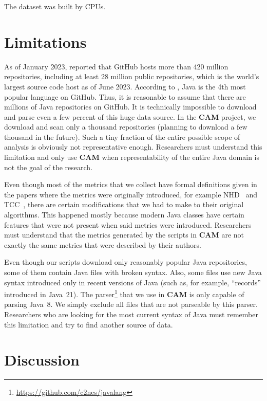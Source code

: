 \documentclass[sigplan,nonacm,review,anonymous]{acmart}
\newcommand\cam{{\sffamily\bfseries CAM}}
\begin{document}
The dataset was built by
\unskip{}
CPUs\unskip{}.

\section{Limitations}\label{sec:limitations}

As of January 2023, \citet{dohmke2023} reported that GitHub hosts more than
420 million repositories, including at least 28 million public repositories,
which is the world's largest source code host as of June 2023. According
to \citep{daigle2023}, Java is the 4th most popular language on GitHub. Thus,
it is reasonable to assume that there are millions of Java repositories on
GitHub. It is technically impossible to download and parse even a few percent
of this huge data source. In the \cam{} project, we download and scan only a
thousand repositories (planning to download a few thousand in the future).
Such a tiny fraction of the entire possible scope of analysis is obviously
not representative enough. Researchers must understand this limitation and
only use \cam{} when representability of the entire Java domain is not the
goal of the research.

Even though most of the metrics that we collect have formal definitions
given in the papers where the metrics were originally introduced,
for example NHD~\citep{counsell2006interpretation} and
TCC~\citep{bieman1995cohesion}, there are certain modifications
that we had to make to their original algorithms. This happened mostly
because modern Java classes have certain features that were not present
when said metrics were introduced. Researchers must understand that
the metrics generated by the scripts in \cam{} are not exactly the same
metrics that were described by their authors.

Even though our scripts download only reasonably popular Java repositories,
some of them contain Java files with broken syntax. Also, some files use
new Java syntax introduced only in recent versions of Java (such as,
for example, ``records'' introduced in Java~21).
The parser\footnote{\url{https://github.com/c2nes/javalang}} that we use
in \cam{} is only capable of parsing Java~8. We simply exclude all files
that are not parseable by this parser. Researchers who are looking for
the most current syntax of Java must remember this limitation and try
to find another source of data.

\section{Discussion}\label{sec:discussion}
\end{document}
